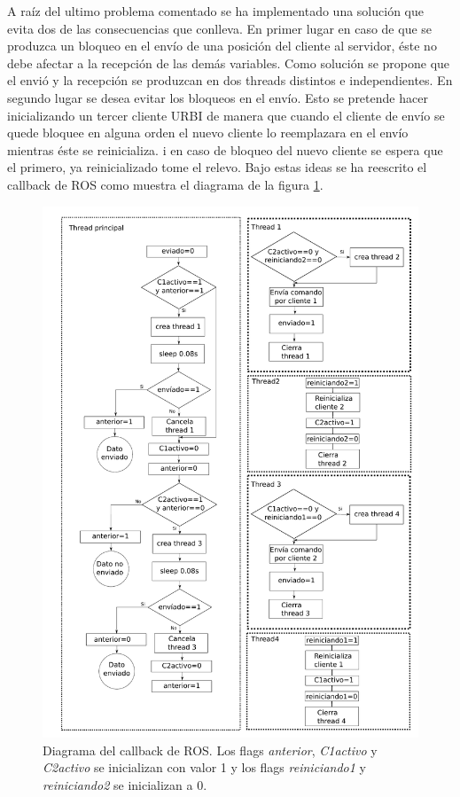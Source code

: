 \documentclass[12pt,a4paper,final,twoside]{book}
\begin{document}
A raíz del ultimo problema comentado se ha implementado una solución que evita dos de las consecuencias que conlleva.
En primer lugar en caso de que se produzca un bloqueo en el envío de una posición del cliente al servidor, éste no debe afectar a la recepción de las demás variables. Como solución se propone que el envió y la recepción se produzcan en dos threads distintos e independientes. 
En segundo lugar se desea evitar los bloqueos en el envío. Esto se pretende hacer inicializando un tercer cliente URBI de manera que cuando el cliente de envío se quede bloquee en alguna orden el nuevo cliente lo reemplazara en el envío mientras éste se reinicializa. i en caso de bloqueo del nuevo cliente se espera que el primero, ya reinicializado tome el relevo.
Bajo estas ideas se ha reescrito el callback de ROS como muestra el diagrama de la figura \ref{fig:Call}.

\begin{figure}[H]
	\centering
    \includegraphics[scale=0.77]{images/esquemaCall.pdf}
	 \caption{Diagrama del callback de ROS. Los flags \textit{anterior}, \textit{C1activo} y \textit{C2activo}  se inicializan con valor 1 y los flags \textit{reiniciando1} y \textit{reiniciando2} se inicializan a 0.}
  \label{fig:Call}
\end{figure}
\end{document}

